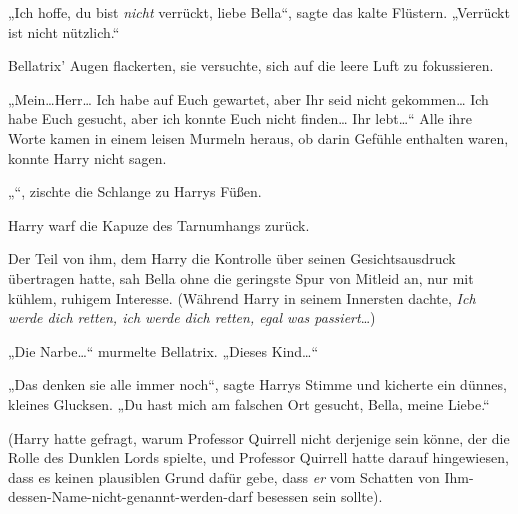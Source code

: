 „Ich hoffe, du bist \emph{nicht} verrückt, liebe Bella“, sagte das kalte Flüstern. „Verrückt ist nicht nützlich.“

Bellatrix' Augen flackerten, sie versuchte, sich auf die leere Luft zu fokussieren.

„Mein…Herr… Ich habe auf Euch gewartet, aber Ihr seid nicht gekommen… Ich habe Euch gesucht, aber ich konnte Euch nicht finden… Ihr lebt…“ Alle ihre Worte kamen in einem leisen Murmeln heraus, ob darin Gefühle enthalten waren, konnte Harry nicht sagen.

„“, zischte die Schlange zu Harrys Füßen.

Harry warf die Kapuze des Tarnumhangs zurück.

Der Teil von ihm, dem Harry die Kontrolle über seinen Gesichtsausdruck übertragen hatte, sah Bella ohne die geringste Spur von Mitleid an, nur mit kühlem, ruhigem Interesse. (Während Harry in seinem Innersten dachte, \emph{Ich werde dich retten, ich werde dich retten, egal was passiert}…)

„Die Narbe…“ murmelte Bellatrix. „Dieses Kind…“

„Das denken sie alle immer noch“, sagte Harrys Stimme und kicherte ein dünnes, kleines Glucksen. „Du hast mich am falschen Ort gesucht, Bella, meine Liebe.“

(Harry hatte gefragt, warum Professor Quirrell nicht derjenige sein könne, der die Rolle des Dunklen Lords spielte, und Professor Quirrell hatte darauf hingewiesen, dass es keinen plausiblen Grund dafür gebe, dass \emph{er} vom Schatten von Ihm-dessen-Name-nicht-genannt-werden-darf besessen sein sollte).

